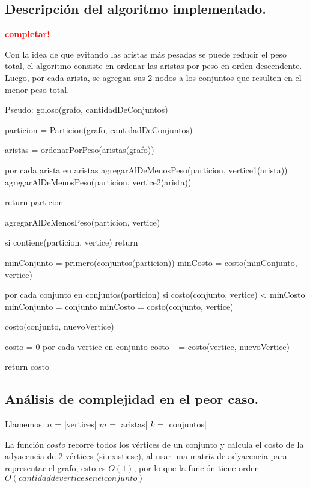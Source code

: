 \subsection{Descripción del algoritmo implementado.}
\vspace*{0.3cm}

\textcolor{red}{\textbf{completar!}}

Con la idea de que evitando las aristas más pesadas se puede reducir el peso
total, el algoritmo consiste en ordenar las aristas por peso en orden
descendente. Luego, por cada arista, se agregan sus 2 nodos a los conjuntos que
resulten en el menor peso total.

Pseudo:
goloso(grafo, cantidadDeConjuntos) {
	particion = Particion(grafo, cantidadDeConjuntos)

	aristas = ordenarPorPeso(aristas(grafo))

	por cada arista en aristas {
		agregarAlDeMenosPeso(particion, vertice1(arista))
		agregarAlDeMenosPeso(particion, vertice2(arista))
	}

	return particion
}

agregarAlDeMenosPeso(particion, vertice) {
	si contiene(particion, vertice)
		return

	minConjunto = primero(conjuntos(particion))
	minCosto = costo(minConjunto, vertice)

	por cada conjunto en conjuntos(particion) {
		si costo(conjunto, vertice) < minCosto {
			minConjunto = conjunto
			minCosto = costo(conjunto, vertice)
		}
	}
}

costo(conjunto, nuevoVertice) {
	costo = 0
	por cada vertice en conjunto {
		costo += costo(vertice, nuevoVertice)
	}

	return costo
}


\newpage
\subsection{Análisis de complejidad en el peor caso.}
\vspace*{0.3cm}

Llamemos:
$n$ = |vertices|
$m$ = |aristas|
$k$ = |conjuntos|

\vspace*{0.3cm}

La función $costo$ recorre todos los vértices de un conjunto y calcula el
costo de la adyacencia de 2 vértices (si existiese), al usar una matriz de
adyacencia para representar el grafo, esto es $O(1)$, por lo que la función
tiene orden $O(cantidad de vertices en el conjunto)$

